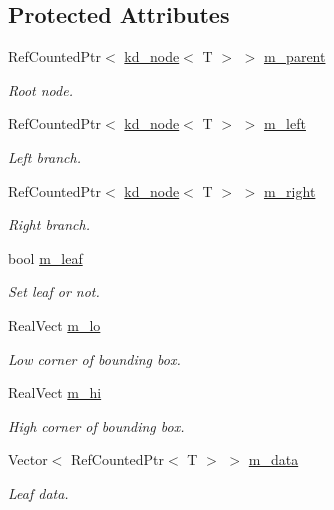 \subsection*{Protected Attributes}
\begin{DoxyCompactItemize}
\item 
Ref\+Counted\+Ptr$<$ \hyperlink{classkd__node}{kd\+\_\+node}$<$ T $>$ $>$ \hyperlink{classkd__node_a2e506cc45509a5238060430ccf0f24ca}{m\+\_\+parent}
\begin{DoxyCompactList}\small\item\em Root node. \end{DoxyCompactList}\item 
Ref\+Counted\+Ptr$<$ \hyperlink{classkd__node}{kd\+\_\+node}$<$ T $>$ $>$ \hyperlink{classkd__node_ae7f6e2c3ae60c874e1dae4dc51bc404c}{m\+\_\+left}
\begin{DoxyCompactList}\small\item\em Left branch. \end{DoxyCompactList}\item 
Ref\+Counted\+Ptr$<$ \hyperlink{classkd__node}{kd\+\_\+node}$<$ T $>$ $>$ \hyperlink{classkd__node_a5aec903a3bbfc430b1a801e05d8f5b6c}{m\+\_\+right}
\begin{DoxyCompactList}\small\item\em Right branch. \end{DoxyCompactList}\item 
bool \hyperlink{classkd__node_adeb75a3c3913331b6fc9a7fba623243f}{m\+\_\+leaf}
\begin{DoxyCompactList}\small\item\em Set leaf or not. \end{DoxyCompactList}\item 
Real\+Vect \hyperlink{classkd__node_a8218b763208b296d1d74117bbac74a64}{m\+\_\+lo}
\begin{DoxyCompactList}\small\item\em Low corner of bounding box. \end{DoxyCompactList}\item 
Real\+Vect \hyperlink{classkd__node_ad471be790fdc008625da736b924df21d}{m\+\_\+hi}
\begin{DoxyCompactList}\small\item\em High corner of bounding box. \end{DoxyCompactList}\item 
Vector$<$ Ref\+Counted\+Ptr$<$ T $>$ $>$ \hyperlink{classkd__node_af7746a3e33a2bc58128efbe830e6681b}{m\+\_\+data}
\begin{DoxyCompactList}\small\item\em Leaf data. \end{DoxyCompactList}\end{DoxyCompactItemize}


